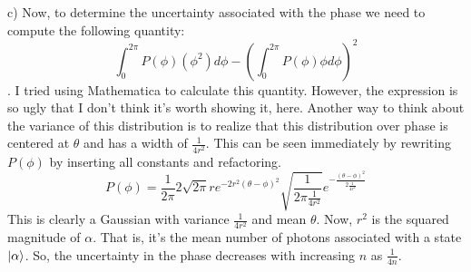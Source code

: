 \begin{homeworkProblem}[Problem 9]
\begin{homeworkSection}{c)}
      Now, to determine the uncertainty associated with the phase we need to
      compute the following quantity:
      \[
         \int_{0}^{2 \pi} P(\phi) (\phi^{2}) d \phi -
         \left(\int_{0}^{2 \pi} P(\phi) \phi d \phi\right)^2
      \].
      I tried using Mathematica to calculate this quantity. However, the
      expression is so ugly that I don't think it's worth showing it, here.
      Another way to think about the variance of this distribution is to realize
      that this distribution over phase is centered at $ \theta $ and has a
      width of $ \frac{1}{4 r^2} $. This can be seen immediately by rewriting $
      P(\phi)$ by inserting all constants and refactoring.
      \begin{equation}
         P(\phi) = \frac{1}{2 \pi} 2 \sqrt{2 \pi } r e^{-2 r^2 (\theta -\phi
         )^2}  \sqrt{\frac{1}{2 \pi \frac{1}{4 r^2}}} e^{-\frac{(\theta -
      \phi)^2}{2 \frac{1}{4 r^2}}}
      \end{equation}
      This is clearly a Gaussian with variance $ \frac{1}{4 r^2} $ and mean $ \theta $.
      Now, $ r^2 $ is the squared magnitude of $ \alpha $. That is, it's the
      mean number of photons associated with a state $ \ket{\alpha} $. So, the
      uncertainty in the phase decreases with increasing $n$ as $ \frac{1}{4 n} $.
   \end{homeworkSection}
\end{homeworkProblem}
